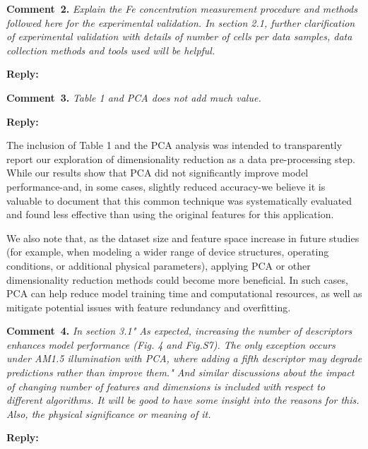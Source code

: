 \documentclass[a4paper,fleqn]{cas-sc}
\begin{document}
\vspace{1cm}
\noindent
\textcolor[rgb]{0.00,0.50,1.00}{\textbf{Comment~2.}}
\emph{Explain the Fe concentration measurement procedure and methods followed here for the experimental validation. In section 2.1, further clarification of experimental validation with details of number of cells per data samples, data collection methods and tools used will be helpful.}

\noindent
\textcolor[rgb]{0.51,0.00,0.00}{\textbf{Reply:}}


\vspace{1cm}
\noindent
\textcolor[rgb]{0.00,0.50,1.00}{\textbf{Comment~3.}}
\emph{Table 1 and PCA does not add much value.}

\noindent
\textcolor[rgb]{0.51,0.00,0.00}{\textbf{Reply:}}


The inclusion of Table 1 and the PCA analysis was intended to transparently report our exploration of dimensionality reduction as a data pre-processing step. 
While our results show that PCA did not significantly improve model performance-and, in some cases, slightly reduced accuracy-we believe it is valuable to document that this common technique was systematically evaluated and found less effective than using the original features for this application.


We also note that, as the dataset size and feature space increase in future studies (for example, when modeling a wider range of device structures, operating conditions, or additional physical parameters), applying PCA or other dimensionality reduction methods could become more beneficial. 
In such cases, PCA can help reduce model training time and computational resources, as well as mitigate potential issues with feature redundancy and overfitting.

\vspace{1cm}
\noindent
\textcolor[rgb]{0.00,0.50,1.00}{\textbf{Comment~4.}}
\emph{In section 3.1" As expected, increasing the number of descriptors enhances model performance (Fig. 4 and Fig.S7). The only exception occurs under AM1.5 illumination with PCA, where adding a fifth descriptor may degrade predictions rather than improve them." And similar discussions about the impact of changing number of features and dimensions is included with respect to different algorithms.  It will be good to have some insight into the reasons for this. Also, the physical significance or meaning of it.}

\noindent
\textcolor[rgb]{0.51,0.00,0.00}{\textbf{Reply:}}
\end{document}

